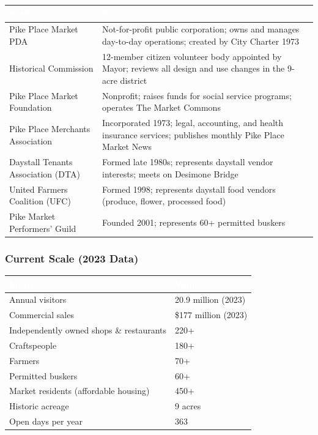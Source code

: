 \documentclass[11pt,letterpaper]{article}
\newcommand{\tableheader}[1]{\textbf{\sffamily\textcolor{white}{#1}}}
\begin{document}
\begin{center}
\begin{tabularx}{\textwidth}{L{4cm}X}
\toprule
{}
\tableheader{Entity} & \tableheader{Role} \\
\midrule
Pike Place Market PDA & Not-for-profit public corporation; owns and manages day-to-day operations; created by City Charter 1973 \\
Historical Commission & 12-member citizen volunteer body appointed by Mayor; reviews all design and use changes in the 9-acre district \\
Pike Place Market Foundation & Nonprofit; raises funds for social service programs; operates The Market Commons \\
Pike Place Merchants Association & Incorporated 1973; legal, accounting, and health insurance services; publishes monthly Pike Place Market News \\
Daystall Tenants Association (DTA) & Formed late 1980s; represents daystall vendor interests; meets on Desimone Bridge \\
United Farmers Coalition (UFC) & Formed 1998; represents daystall food vendors (produce, flower, processed food) \\
Pike Market Performers' Guild & Founded 2001; represents 60+ permitted buskers \\
\bottomrule
\end{tabularx}
\end{center}

\subsubsection{Current Scale (2023 Data)}

\begin{center}
\begin{tabularx}{\textwidth}{L{5cm}X}
\toprule
{}
\tableheader{Metric} & \tableheader{Value} \\
\midrule
Annual visitors & 20.9 million (2023) \\
Commercial sales & \$177 million (2023) \\
Independently owned shops \& restaurants & 220+ \\
Craftspeople & 180+ \\
Farmers & 70+ \\
Permitted buskers & 60+ \\
Market residents (affordable housing) & 450+ \\
Historic acreage & 9 acres \\
Open days per year & 363 \\
\bottomrule
\end{tabularx}
\end{center}
\end{document}
